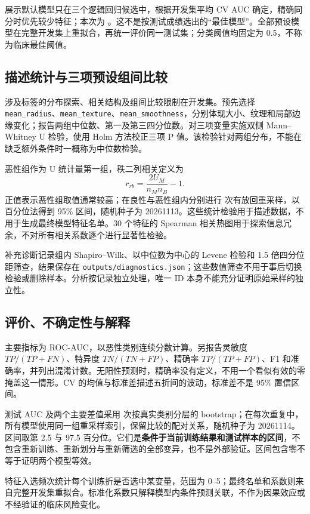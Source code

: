 \documentclass[UTF8,fontset=none,zihao=-4]{ctexart}
\begin{document}
展示默认模型只在三个逻辑回归候选中，根据开发集平均 CV AUC 确定，精确同分时优先较少特征；本次为 \DefaultModel{}。这不是按测试成绩选出的“最佳模型”。全部预设模型在完整开发集上重拟合，再统一评价同一测试集；分类阈值均固定为 0.5，不称为临床最佳阈值。

\subsection{描述统计与三项预设组间比较}
涉及标签的分布探索、相关结构及组间比较限制在开发集。预先选择 \texttt{mean\_radius}、\texttt{mean\_texture}、\texttt{mean\_smoothness}，分别体现大小、纹理和局部边缘变化；报告两组中位数、第一及第三四分位数。对三项变量实施双侧 Mann--Whitney U 检验，使用 Holm 方法校正三项 P 值。该检验针对两组分布，不能在缺乏额外条件时一概称为中位数检验\cite{mannwhitney}。

恶性组作为 U 统计量第一组，秩二列相关定义为
\begin{equation}
r_{rb}=\frac{2U_M}{n_M n_B}-1.
\end{equation}
正值表示恶性组取值通常较高；在良性与恶性组内分别进行 \BootstrapN{} 次有放回重采样，以百分位法得到 95\% 区间，随机种子为 20261113。这些统计检验用于描述数据，不用于生成最终模型特征名单。30 个特征的 Spearman 相关热图用于探索信息冗余，不对所有相关系数逐个进行显著性检验。

补充诊断记录组内 Shapiro--Wilk、以中位数为中心的 Levene 检验和 1.5 倍四分位距筛查，结果保存在 \texttt{outputs/diagnostics.json}；这些数值筛查不用于事后切换检验或删除样本。分析按记录独立处理，唯一 ID 本身不能充分证明原始采样的独立性。

\subsection{评价、不确定性与解释}
主要指标为 ROC-AUC，以恶性类别连续分数计算。另报告灵敏度 $TP/(TP+FN)$、特异度 $TN/(TN+FP)$、精确率 $TP/(TP+FP)$、F1 和准确率，并列出混淆计数。无阳性预测时，精确率没有定义，不用一个看似有效的零掩盖这一情形。CV 的均值与标准差描述五折间的波动，标准差不是 95\% 置信区间。

测试 AUC 及两个主要差值采用 \BootstrapN{} 次按真实类别分层的 bootstrap；在每次重复中，所有模型使用同一组重采样索引，保留比较的配对关系，随机种子为 20261114。区间取第 2.5 与 97.5 百分位。它们是\textbf{条件于当前训练结果和测试样本的区间}，不包含重新训练、重新划分与重新筛选的全部变异，也不是外部验证。区间包含零不等于证明两个模型等效。

特征入选频次统计每个训练折是否选中某变量，范围为 0--5；最终名单和系数则来自完整开发集重拟合。标准化系数只解释模型内条件预测关联，不作为因果效应或不经验证的临床风险变化。
\end{document}
